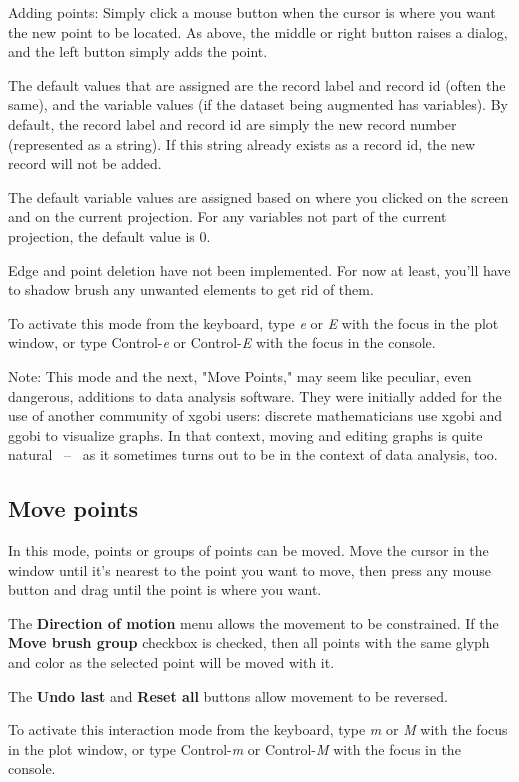 \documentclass[11pt]{article}
\def\Widget#1{\textbf{#1}}
\begin{document}
Adding points: Simply click a mouse button when the cursor is where
you want the new point to be located.  As above, the middle or right
button raises a dialog, and the left button simply adds the point.

The default values that are assigned are the record label and record
id (often the same), and the variable values (if the dataset being
augmented has variables).  By default, the record label and record id
are simply the new record number (represented as a string).  If this
string already exists as a record id, the new record will not be added.

The default variable values are assigned based on where you clicked
on the screen and on the current projection.  For any variables not
part of the current projection, the default value is 0.

Edge and point deletion have not been implemented.  For now at
least, you'll have to shadow brush any unwanted elements to get
rid of them.

To activate this mode from the keyboard, type {\em e} or {\em E}
with the focus in the plot window, or type Control-{\em e} or
Control-{\em E} with the focus in the console.

Note: This mode and the next, "Move Points," may seem like peculiar,
even dangerous, additions to data analysis software.  They were
initially added for the use of another community of xgobi users:
discrete mathematicians use xgobi and ggobi to visualize graphs.  In
that context, moving and editing graphs is quite natural ~--~ as it
sometimes turns out to be in the context of data analysis, too.

\subsection{Move points}
\label{slbl:MovePoints}

In this mode, points or groups of points can be moved.  Move
the cursor in the window until it's nearest to the point you
want to move, then press any mouse button and drag until the
point is where you want.

The \Widget{Direction of motion} menu allows the movement to be
constrained.  If the \Widget{Move brush group} checkbox is
checked, then all points with the same glyph and color as
the selected point will be moved with it.

The \Widget{Undo last} and \Widget{Reset all} buttons allow movement
to be reversed.

To activate this interaction mode from the keyboard, type {\em m} or
{\em M} with the focus in the plot window, or type Control-{\em m} or
Control-{\em M} with the focus in the console.
\end{document}
